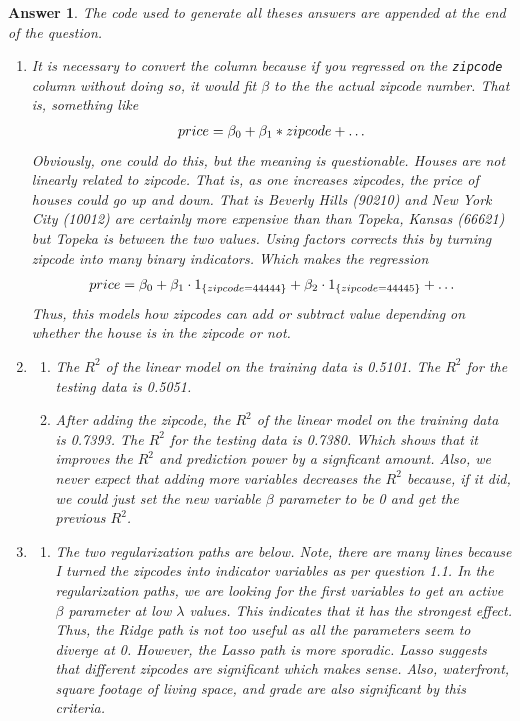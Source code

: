 \documentclass[12pt]{article}
\theoremstyle{colon}
\newtheorem*{answer}{Answer}
\begin{document}
\begin{answer}
  The code used to generate all theses answers are appended at the end of the question.
  \begin{enumerate}[label=\arabic*)]
    \item It is necessary to convert the column because if you regressed on the \texttt{zipcode} column without doing so, it would fit $\beta$ to the the actual zipcode number. That is, something like
      \begin{gather*}
        price = \beta_0 + \beta_1 * zipcode + \mathellipsis
      \end{gather*}
      Obviously, one could do this, but the meaning is questionable. Houses are not linearly related to zipcode. That is, as one increases zipcodes, the price of houses could go up and down. That is Beverly Hills (90210) and New York City (10012) are certainly more expensive than than Topeka, Kansas (66621) but Topeka is between the two values. Using factors corrects this by turning zipcode into many binary indicators. Which makes the regression
      \begin{gather*}
        price = \beta_0 + \beta_1 \cdot 1_{\{zipcode=44444\}} + \beta_2 \cdot 1_{\{zipcode=44445\}} + \mathellipsis
      \end{gather*}
      Thus, this models how zipcodes can add or subtract value depending on whether the house is in the zipcode or not.

    \item
      \begin{enumerate}[label=\alph*)]
        \item The $R^2$ of the linear model on the training data is 0.5101. The $R^2$ for the testing data is 0.5051.
        \item After adding the zipcode, the $R^2$ of the linear model on the training data is 0.7393. The $R^2$ for the testing data is 0.7380. Which shows that it improves the $R^2$ and prediction power by a signficant amount. Also, we never expect that adding more variables decreases the $R^2$ because, if it did, we could just set the new variable $\beta$ parameter to be 0 and get the previous $R^2$.
      \end{enumerate}

    \item
      \begin{enumerate}[label=\alph*)]
        \item The two regularization paths are below. Note, there are many lines because I turned the zipcodes into indicator variables as per question 1.1. In the regularization paths, we are looking for the first variables to get an active $\beta$ parameter at low $\lambda$ values. This indicates that it has the strongest effect. Thus, the Ridge path is not too useful as all the parameters seem to diverge at 0. However, the Lasso path is more sporadic. Lasso suggests that different zipcodes are significant which makes sense. Also, waterfront, square footage of living space, and grade are also significant by this criteria.


\end{enumerate}
\end{enumerate}
\end{answer}
\end{document}
